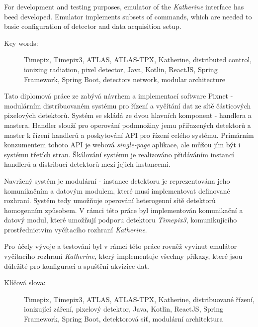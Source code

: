 \documentclass[11pt,twoside,a4paper]{book}
\begin{document}
	For development and testing purposes, emulator of the \textit{Katherine} interface has beed developed. Emulator implements subsets of commands, which are needed to basic configuration of detector and data acquisition setup.

	\vspace*{2cm}
	\begin{description}
		\item[Key words:] Timepix, Timepix3, ATLAS, ATLAS-TPX, Katherine, distributed control, ionizing radiation, pixel detector, Java, Kotlin, ReactJS, Spring Framework, Spring Boot, detectors network, modular architecture
	\end{description}

	\abstractpagecz
	Tato diplomová práce ze zabývá návrhem a implementací software Pixnet - modulárním distribuovaném systému pro řízení a vyčítání dat ze sítě částicových pixelových detektorů. Systém se skládá ze dvou hlavních komponent - handlera a mastera. Handler slouží pro operování podmnožiny jemu přiřazených detektorů a master k řízení handlerů a poskytování API pro řízení celého systému. Primárním konzumentem tohoto API je webová \textit{single-page} aplikace, ale můžou jím být i systému třetích stran. Škálování systému je realizováno přidáváním instancí handlerů a distribucí detektorů mezi jejich instancemi.
	
	Navržený systém je modulární - instance detektoru je reprezentována jeho komunikačním a datovým modulem, které musí implementovat definované rozhraní. Systém tedy umožňuje operování heterogenní sítě detektorů homogenním způsobem. V rámci této práce byl implementován komunikační a datový modul, které umožňují podporu detektoru \textit{Timepix3}, komunikujícího prostřednictvím vyčítacího rozhraní \textit{Katherine}.

	Pro účely vývoje a testování byl v rámci této práce rovněž vyvinut emulátor vyčítacího rozhraní \textit{Katherine}, který implementuje všechny příkazy, které jsou důležité pro konfiguraci a spuštění akvizice dat.

	\vspace*{2cm}
	\begin{description}
		\item[Klíčová slova:] Timepix, Timepix3, ATLAS, ATLAS-TPX, Katherine, distribuované řízení, ionizující záření, pixelový detektor, Java, Kotlin, ReactJS, Spring Framework, Spring Boot, detektorová síť, modulární architektura
	\end{description}
\end{document}
